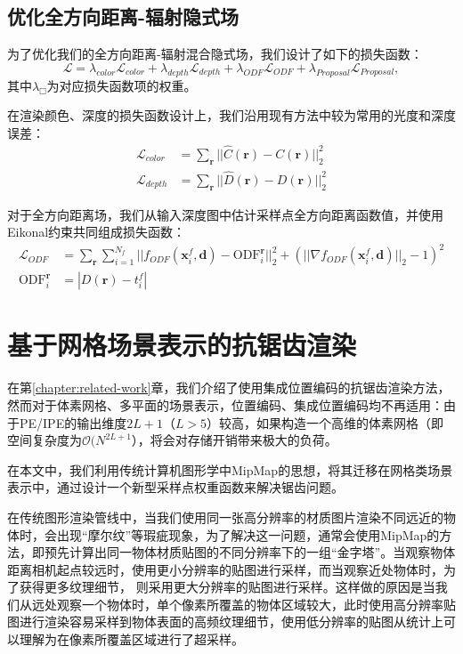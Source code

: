 \subsection{优化全方向距离-辐射隐式场}
为了优化我们的全方向距离-辐射混合隐式场，我们设计了如下的损失函数：
\begin{equation}
    \mathcal{L} = \lambda_{color}\mathcal{L}_{color} + \lambda_{depth}\mathcal{L}_{depth}+\lambda_{ODF}\mathcal{L}_{ODF}+\lambda_{Proposal}\mathcal{L}_{Proposal},
\end{equation}
其中$\lambda_{\Box}$为对应损失函数项的权重。

在渲染颜色、深度的损失函数设计上，我们沿用现有方法\cite{mildenhall_nerf_2020}中较为常用的光度和深度误差：
\begin{align}
    \mathcal{L}_{color} &= \sum_{\mathbf{r}}||\hat{C}(\mathbf{r}) - C(\mathbf{r})||_2^2\\
    \mathcal{L}_{depth} &= \sum_{\mathbf{r}}||\hat{D}(\mathbf{r}) - D(\mathbf{r})||_2^2
\end{align}

对于全方向距离场，我们从输入深度图中估计采样点全方向距离函数值，并使用Eikonal约束\cite{gropp_implicit_2020}共同组成损失函数：
\begin{align}
    \mathcal{L}_{ODF} &= \sum_{\mathbf{r}}\sum_{i=1}^{N_f}||f_{ODF}(\mathbf{x}_i^f, \mathbf{d}) - \text{ODF}_i^{\mathbf{r}}||_2^2 + (||\nabla f_{ODF}(\mathbf{x}_i^f, \mathbf{d})||_2-1)^2\\
    \text{ODF}_i^{\mathbf{r}} &= |D(\mathbf{r}) - t_i^f|
\end{align}

\section{基于网格场景表示的抗锯齿渲染}
\label{sec: omninerf-anti-aliasing}
在第\ref{chapter:related-work}章，我们介绍了使用集成位置编码的抗锯齿渲染方法\cite{barron_mip-nerf_2021, barron_mip-nerf_2022}，然而对于体素网格、多平面的场景表示，位置编码、集成位置编码均不再适用：由于PE/IPE的输出维度$2L+1$（$L>5$）较高，如果构造一个高维的体素网格（即空间复杂度为$\mathcal{O}(N^{2L+1}$），将会对存储开销带来极大的负荷。

在本文中，我们利用传统计算机图形学中MipMap\cite{williams_pyramidal_1983}的思想，将其迁移在网格类场景表示中，通过设计一个新型采样点权重函数来解决锯齿问题。

在传统图形渲染管线中，当我们使用同一张高分辨率的材质图片渲染不同远近的物体时，会出现“摩尔纹”等瑕疵现象，为了解决这一问题，通常会使用MipMap的方法，即预先计算出同一物体材质贴图的不同分辨率下的一组“金字塔”。当观察物体距离相机起点较远时，使用更小分辨率的贴图进行采样，而当观察近处物体时，为了获得更多纹理细节， 则采用更大分辨率的贴图进行采样。这样做的原因是当我们从远处观察一个物体时，单个像素所覆盖的物体区域较大，此时使用高分辨率贴图进行渲染容易采样到物体表面的高频纹理细节，使用低分辨率的贴图从统计上可以理解为在像素所覆盖区域进行了超采样。

